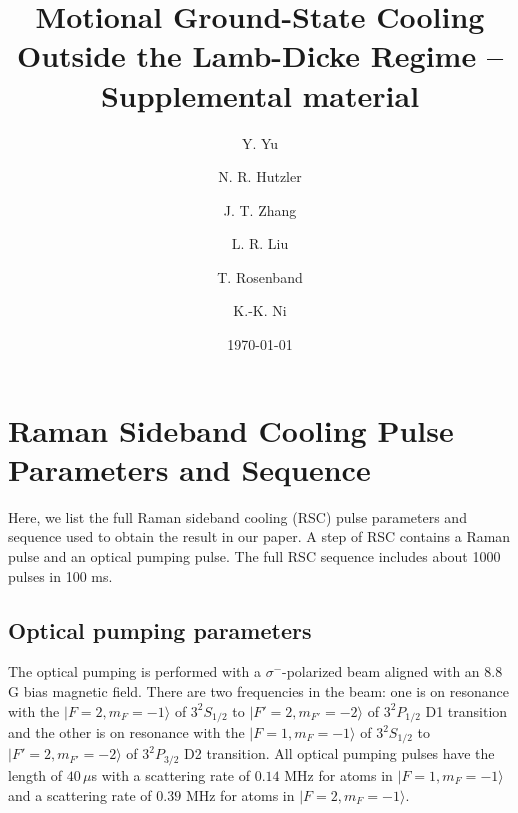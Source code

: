 \documentclass[aps,secnumarabic,amsmath,amssymb]{revtex4}
\begin{document}
\title{Motional Ground-State Cooling Outside the Lamb-Dicke Regime -- Supplemental material}
\author{Y. Yu}
\author{N. R. Hutzler}
\author{J. T. Zhang}
\author{L. R. Liu}
\author{T. Rosenband}
\author{K.-K. Ni}

\date{\today}

\maketitle

\section{Raman Sideband Cooling Pulse Parameters and Sequence}
Here, we list the full Raman sideband cooling (RSC) pulse parameters and sequence used to obtain the result in our paper.
A step of RSC contains a Raman pulse and an optical pumping pulse.
The full RSC sequence includes about 1000 pulses in 100 ms.

\subsection{Optical pumping parameters}
The optical pumping is performed with a $\sigma^-$-polarized beam aligned with an 8.8 G bias magnetic field.
There are two frequencies in the beam: one is on resonance with
the $|F=2,m_F=-1\rangle$ of $3^2S_{1/2}$ to $|F'=2,m_{F'}=-2\rangle$ of $3^2P_{1/2}$ D1 transition
and the other is on resonance with the $|F=1,m_F=-1\rangle$ of $3^2S_{1/2}$ to $|F'=2,m_{F'}=-2\rangle$ of $3^2P_{3/2}$ D2 transition.
All optical pumping pulses have the length of $40\,\mu$s
with a scattering rate of $0.14$ MHz for atoms in $|F=1,m_F=-1\rangle$
and a scattering rate of $0.39$ MHz for atoms in $|F=2,m_F=-1\rangle$.
\end{document}
